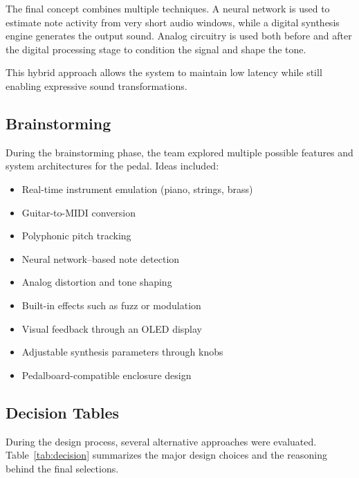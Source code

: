 \documentclass[12pt]{article}
\begin{document}
The final concept combines multiple techniques. A neural network is used to estimate note activity from very short audio windows, while a digital synthesis engine generates the output sound. Analog circuitry is used both before and after the digital processing stage to condition the signal and shape the tone.

This hybrid approach allows the system to maintain low latency while still enabling expressive sound transformations.
\subsection*{Brainstorming}
During the brainstorming phase, the team explored multiple possible features and system architectures for the pedal. Ideas included:

\begin{itemize}
\item Real-time instrument emulation (piano, strings, brass)
\item Guitar-to-MIDI conversion
\item Polyphonic pitch tracking
\item Neural network–based note detection
\item Analog distortion and tone shaping
\item Built-in effects such as fuzz or modulation
\item Visual feedback through an OLED display
\item Adjustable synthesis parameters through knobs
\item Pedalboard-compatible enclosure design
\end{itemize}

\subsection*{Decision Tables}
During the design process, several alternative approaches were evaluated. Table~\ref{tab:decision} summarizes the major design choices and the reasoning behind the final selections.
\end{document}
